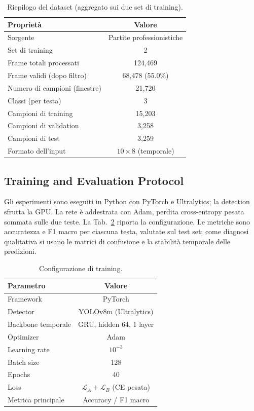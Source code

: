 \documentclass[10pt,twocolumn,a4paper]{article}
\begin{document}
	\begin{table}[h]
		\centering
		\caption{Riepilogo del dataset (aggregato sui due set di training).}
		\label{tab:dataset}
		\begin{tabular}{|l|c|}
			\hline
			\textbf{Proprietà} & \textbf{Valore} \\
			\hline
			Sorgente & Partite professionistiche \\
			Set di training & 2 \\
			Frame totali processati & 124{,}469 \\
			Frame validi (dopo filtro) & 68{,}478 (55.0\%) \\
			Numero di campioni (finestre) & 21{,}720 \\
			Classi (per testa) & 3 \\
			Campioni di training & 15{,}203 \\
			Campioni di validation & 3{,}258 \\
			Campioni di test & 3{,}259 \\
			Formato dell'input & $10\times8$ (temporale) \\
			\hline
		\end{tabular}
	\end{table}

	\subsection{Training and Evaluation Protocol}

	Gli esperimenti sono eseguiti in Python con PyTorch e Ultralytics; la
	detection sfrutta la GPU. La rete è addestrata con Adam, perdita
	cross-entropy pesata sommata sulle due teste. La Tab.~\ref{tab:training}
	riporta la configurazione. Le metriche sono accuratezza e F1 macro per
	ciascuna testa, valutate sul test set; come diagnosi qualitativa si usano le
	matrici di confusione e la stabilità temporale delle predizioni.

	\begin{table}[h]
		\centering
		\caption{Configurazione di training.}
		\label{tab:training}
		\begin{tabular}{|l|c|}
			\hline
			\textbf{Parametro} & \textbf{Valore} \\
			\hline
			Framework & PyTorch \\
			Detector & YOLOv8m (Ultralytics) \\
			Backbone temporale & GRU, hidden 64, 1 layer \\
			Optimizer & Adam \\
			Learning rate & $10^{-3}$ \\
			Batch size & 128 \\
			Epochs & 40 \\
			Loss & $\mathcal{L}_A+\mathcal{L}_B$ (CE pesata) \\
			Metrica principale & Accuracy / F1 macro \\
			\hline
		\end{tabular}
	\end{table}
\end{document}
